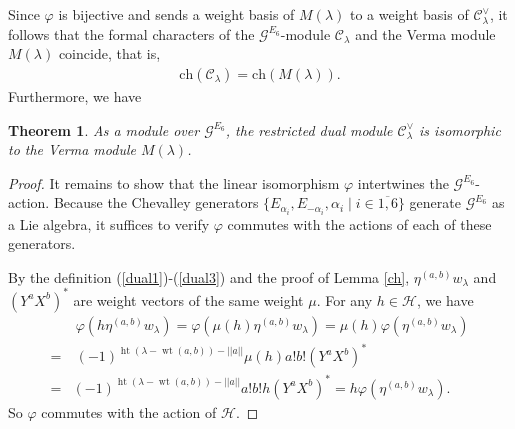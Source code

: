 \documentclass[12pt]{article}
\numberwithin{equation}{section}
\newtheorem{theorem}{Theorem}[section]
\theoremstyle{definition}
\theoremstyle{remark}
\begin{document}
Since $\varphi$ is bijective and sends a weight basis of $M(\lambda)$ to a weight basis of $\mathscr{C}_{\lambda}^{\vee}$, it follows that the formal characters of the $\mathscr{G}^{E_6}$-module $\mathscr{C}_{\lambda}$ and the Verma module $M(\lambda)$ coincide, that is,
\begin{eqnarray}
	\text{ch}(\mathscr{C}_{\lambda})=\text{ch}(M(\lambda)). \label{char}
\end{eqnarray}
Furthermore, we have
\begin{theorem}\label{thiso}
	As a module over $\mathscr{G}^{E_6}$, the restricted dual module $\mathscr{C}_{\lambda}^{\vee}$ is isomorphic to the Verma module $M(\lambda)$.
\end{theorem}
\begin{proof}
	It remains to show that the linear isomorphism $\varphi$ intertwines the $\mathscr{G}^{E_6}$-action. Because the Chevalley generators $\{E_{\alpha_i},E_{-\alpha_i},\alpha_i\mid i\in\overline{1,6}\}$ generate $\mathscr{G}^{E_6}$ as a Lie algebra, it suffices to verify $\varphi$ commutes with the actions of each of these generators.
	
	By the definition (\ref{dual1})-(\ref{dual3}) and the proof of Lemma \ref{ch}, $\eta^{(a,b)}w_{\lambda}$ and $(Y^{a}X^b)^*$ are weight vectors of the same weight $\mu$. For any $h\in \mathscr{H}$, we have
	\begin{align}
		&\:\varphi(h\eta^{(a,b)}w_{\lambda})=\varphi(\mu(h)\eta^{(a,b)}w_{\lambda})=\mu(h)\varphi(\eta^{(a,b)}w_{\lambda})\nonumber\\
		=&\:(-1)^{\operatorname{ht}(\lambda-\operatorname{wt}(a,b))-||a||}\mu(h)a!b!(Y^{a}X^b)^*\nonumber\\
		=&(-1)^{\operatorname{ht}(\lambda-\operatorname{wt}(a,b))-||a||}a!b!h(Y^{a}X^b)^*=h\varphi(\eta^{(a,b)}w_{\lambda}).
	\end{align}
	So $\varphi$ commutes with the action of $\mathscr{H}$.
	

\end{proof}
\end{document}
